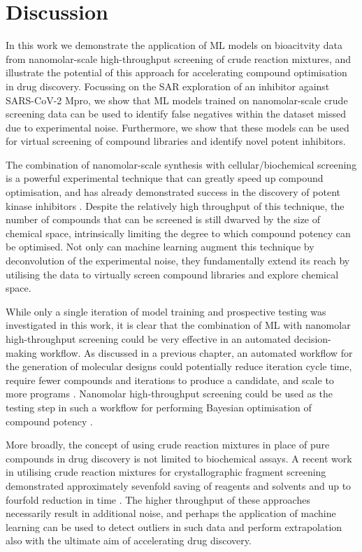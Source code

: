 \section{Discussion}

In this work we demonstrate the application of ML models on bioacitvity data from nanomolar-scale high-throughput screening of crude reaction mixtures, and illustrate the potential of this approach for accelerating compound optimisation in drug discovery. Focussing on the SAR exploration of an inhibitor against SARS-CoV-2 Mpro, we show that ML models trained on nanomolar-scale crude screening data can be used to identify false negatives within the dataset missed due to experimental noise. Furthermore, we show that these models can be used for virtual screening of compound libraries and identify novel potent inhibitors.

The combination of nanomolar-scale synthesis with cellular/biochemical screening is a powerful experimental technique that can greatly speed up compound optimisation, and has already demonstrated success in the discovery of potent kinase inhibitors \cite{Gesmundo2018nanosar, Gehrtz2022nanomolar}. Despite the relatively high throughput of this technique, the number of compounds that can be screened is still dwarved by the size of chemical space, intrinsically limiting the degree to which compound potency can be optimised. Not only can machine learning augment this technique by deconvolution of the experimental noise, they fundamentally extend its reach by utilising the data to virtually screen compound libraries and explore chemical space.

While only a single iteration of model training and prospective testing was investigated in this work, it is clear that the combination of ML with nanomolar high-throughput screening could be very effective in an automated decision-making workflow. As discussed in a previous chapter, an automated workflow for the generation of molecular designs could potentially reduce iteration cycle time, require fewer compounds and iterations to produce a candidate, and scale to more programs \cite{Schneider2018AutomatingDrugDiscovery, Coley2020Outlook, Goldman2022ChemicalDesignLevels}. Nanomolar high-throughput screening could be used as the testing step in such a workflow for performing Bayesian optimisation of compound potency \cite{korovina2019chembo}.

More broadly, the concept of using crude reaction mixtures in place of pure compounds in drug discovery is not limited to biochemical assays. A recent work in utilising crude reaction mixtures for crystallographic fragment screening demonstrated approximately sevenfold saving of reagents and solvents and up to fourfold reduction in time \cite{Baker2020FragementsFromCrude}. The higher throughput of these approaches necessarily result in additional noise, and perhaps the application of machine learning can be used to detect outliers in such data and perform extrapolation also with the ultimate aim of accelerating drug discovery.
